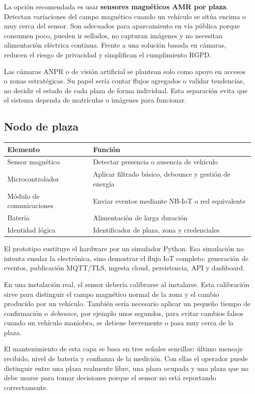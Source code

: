 \documentclass[11pt,a4paper]{article}
\begin{document}
La opción recomendada es usar \textbf{sensores magnéticos AMR por plaza}. Detectan variaciones del campo magnético cuando un vehículo se sitúa encima o muy cerca del sensor. Son adecuados para aparcamiento en vía pública porque consumen poco, pueden ir sellados, no capturan imágenes y no necesitan alimentación eléctrica continua. Frente a una solución basada en cámaras, reducen el riesgo de privacidad y simplifican el cumplimiento RGPD.

Las cámaras ANPR o de visión artificial se plantean solo como apoyo en accesos o zonas estratégicas. Su papel sería contar flujos agregados o validar tendencias, no decidir el estado de cada plaza de forma individual. Esta separación evita que el sistema dependa de matrículas o imágenes para funcionar.

\subsection{Nodo de plaza}
\begin{longtable}{P{4.2cm}P{10.5cm}}
\toprule
\textbf{Elemento} & \textbf{Función} \\
\midrule
\endhead
Sensor magnético & Detectar presencia o ausencia de vehículo \\
Microcontrolador & Aplicar filtrado básico, debounce y gestión de energía \\
Módulo de comunicaciones & Enviar eventos mediante NB-IoT o red equivalente \\
Batería & Alimentación de larga duración \\
Identidad lógica & Identificador de plaza, zona y credenciales \\
\bottomrule
\end{longtable}

El prototipo sustituye el hardware por un simulador Python. Esa simulación no intenta emular la electrónica, sino demostrar el flujo IoT completo: generación de eventos, publicación MQTT/TLS, ingesta cloud, persistencia, API y dashboard.

En una instalación real, el sensor debería calibrarse al instalarse. Esta calibración sirve para distinguir el campo magnético normal de la zona y el cambio producido por un vehículo. También sería necesario aplicar un pequeño tiempo de confirmación o \emph{debounce}, por ejemplo unos segundos, para evitar cambios falsos cuando un vehículo maniobra, se detiene brevemente o pasa muy cerca de la plaza.

El mantenimiento de esta capa se basa en tres señales sencillas: último mensaje recibido, nivel de batería y confianza de la medición. Con ellas el operador puede distinguir entre una plaza realmente libre, una plaza ocupada y una plaza que no debe usarse para tomar decisiones porque el sensor no está reportando correctamente.
\end{document}
